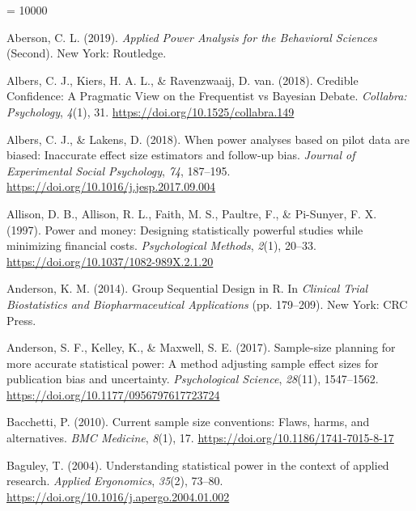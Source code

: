 \documentclass[
  english,
  ,jou, a4paper,floatsintext]{apa6}
\newlength{\cslhangindent}
\newenvironment{cslreferences}%
  {\setlength{\parindent}{0pt}%
  \everypar{\setlength{\hangindent}{\cslhangindent}}\ignorespaces}%
  {\par}
\begin{document}
\begingroup

\interlinepenalty = 10000

\hypertarget{refs}{}
\begin{cslreferences}
\leavevmode\hypertarget{ref-aberson_applied_2019}{}%
Aberson, C. L. (2019). \emph{Applied Power Analysis for the Behavioral Sciences} (Second). New York: Routledge.

\leavevmode\hypertarget{ref-albers_credible_2018}{}%
Albers, C. J., Kiers, H. A. L., \& Ravenzwaaij, D. van. (2018). Credible Confidence: A Pragmatic View on the Frequentist vs Bayesian Debate. \emph{Collabra: Psychology}, \emph{4}(1), 31. \url{https://doi.org/10.1525/collabra.149}

\leavevmode\hypertarget{ref-albers_when_2018}{}%
Albers, C. J., \& Lakens, D. (2018). When power analyses based on pilot data are biased: Inaccurate effect size estimators and follow-up bias. \emph{Journal of Experimental Social Psychology}, \emph{74}, 187--195. \url{https://doi.org/10.1016/j.jesp.2017.09.004}

\leavevmode\hypertarget{ref-allison_power_1997}{}%
Allison, D. B., Allison, R. L., Faith, M. S., Paultre, F., \& Pi-Sunyer, F. X. (1997). Power and money: Designing statistically powerful studies while minimizing financial costs. \emph{Psychological Methods}, \emph{2}(1), 20--33. \url{https://doi.org/10.1037/1082-989X.2.1.20}

\leavevmode\hypertarget{ref-anderson_group_2014}{}%
Anderson, K. M. (2014). Group Sequential Design in R. In \emph{Clinical Trial Biostatistics and Biopharmaceutical Applications} (pp. 179--209). New York: CRC Press.

\leavevmode\hypertarget{ref-anderson_sample-size_2017}{}%
Anderson, S. F., Kelley, K., \& Maxwell, S. E. (2017). Sample-size planning for more accurate statistical power: A method adjusting sample effect sizes for publication bias and uncertainty. \emph{Psychological Science}, \emph{28}(11), 1547--1562. \url{https://doi.org/10.1177/0956797617723724}

\leavevmode\hypertarget{ref-bacchetti_current_2010}{}%
Bacchetti, P. (2010). Current sample size conventions: Flaws, harms, and alternatives. \emph{BMC Medicine}, \emph{8}(1), 17. \url{https://doi.org/10.1186/1741-7015-8-17}

\leavevmode\hypertarget{ref-baguley_understanding_2004}{}%
Baguley, T. (2004). Understanding statistical power in the context of applied research. \emph{Applied Ergonomics}, \emph{35}(2), 73--80. \url{https://doi.org/10.1016/j.apergo.2004.01.002}


\end{cslreferences}
\end{document}
